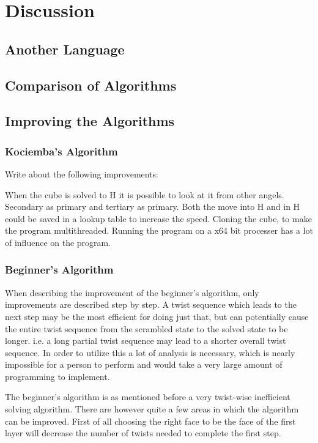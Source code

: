 \chapter{Discussion}

\section{Another Language}

\section{Comparison of Algorithms}

\section{Improving the Algorithms}

\subsection{Kociemba's Algorithm}
Write about the following improvements:

When the cube is solved to H it is possible to look at it from other angels. Secondary as primary and tertiary as primary.
Both the move into H and in H could be saved in a lookup table to increase the speed.
Cloning the cube, to make the program multithreaded.
Running the program on a x64 bit processer has a lot of influence on the program. 

\subsection{Beginner's Algorithm}

When describing the improvement of the beginner's algorithm, only improvements are described step by step. 
A twist sequence which leads to the next step may be the most efficient for doing just that, but can potentially cause the entire twist sequence from the scrambled state to the solved state to be longer. 
i.e. a long partial twist sequence may lead to a shorter overall twist sequence. In order to utilize this a lot of analysis is necessary, which is nearly impossible for a person to perform and would take a very large amount of programming to implement.


The beginner's algorithm is as mentioned before a very twist-wise inefficient solving algorithm. 
There are however quite a few areas in which the algorithm can be improved.
First of all choosing the right face to be the face of the first layer will decrease the number of twists needed to complete the first step.




